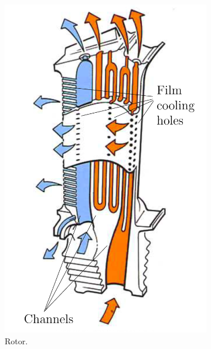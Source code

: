 \documentclass[8pt, aspectratio=169]{beamer}
\begin{document}
\begin{frame}
\begin{minipage}[t]{0.48\textwidth}
\begin{figure}[H]
\begin{subfigure}{.49\textwidth}
				\includegraphics[width=.8\textwidth]{../../assets/rollsroyce/11.png}
				\caption{Rotor.}
			\end{subfigure}
			\begin{subfigure}{.49\textwidth}
				\centering

\end{subfigure}
\end{figure}
\end{minipage}
\end{frame}
\end{document}
